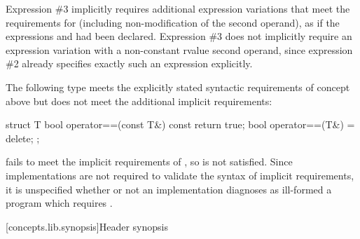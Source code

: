 Expression \#3 implicitly requires additional expression variations that meet the
requirements for  (including non-modification of the second operand),
as if the expressions  and  had been declared.
Expression \#3 does not implicitly require an expression variation with a
non-constant rvalue second operand, since expression \#2 already specifies exactly
such an expression explicitly.
\exitexample

\enterexample
The following type  meets the explicitly stated syntactic requirements
of concept  above but does not meet the additional implicit requirements:

\begin{codeblock}
struct T {
  bool operator==(const T&) const { return true; }
  bool operator==(T&) = delete;
};
\end{codeblock}

 fails to meet the implicit
requirements of , so  is not satisfied. Since
implementations are not required to validate the syntax of implicit requirements, it
is unspecified whether or not an implementation diagnoses as ill-formed a program
which requires .
\exitexample

[concepts.lib.synopsis]{Header  synopsis}

